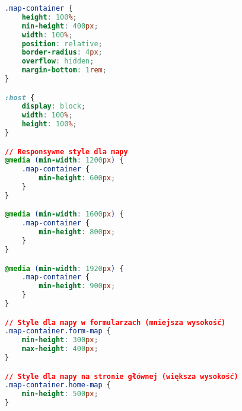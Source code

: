 \begin{lstlisting}[language=CSS, caption={Style CSS mapy},label={lst:cssmapy}]
.map-container {
	height: 100%;
	min-height: 400px;
	width: 100%;
	position: relative;
	border-radius: 4px;
	overflow: hidden;
	margin-bottom: 1rem;
}

:host {
	display: block;
	width: 100%;
	height: 100%;
}

// Responsywne style dla mapy
@media (min-width: 1200px) {
	.map-container {
		min-height: 600px;
	}
}

@media (min-width: 1600px) {
	.map-container {
		min-height: 800px;
	}
}

@media (min-width: 1920px) {
	.map-container {
		min-height: 900px;
	}
}

// Style dla mapy w formularzach (mniejsza wysokość)
.map-container.form-map {
	min-height: 300px;
	max-height: 400px;
}

// Style dla mapy na stronie głównej (większa wysokość)
.map-container.home-map {
	min-height: 500px;
}
\end{lstlisting}

